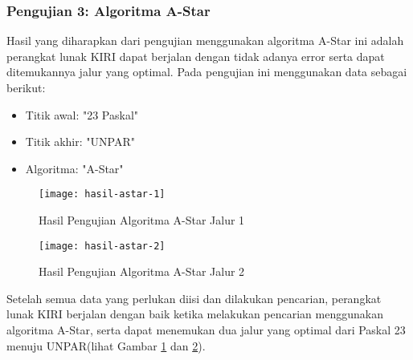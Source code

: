 \subsubsection{Pengujian 3: Algoritma A-Star}
Hasil yang diharapkan dari pengujian menggunakan algoritma A-Star ini adalah perangkat lunak KIRI dapat berjalan dengan tidak adanya error serta dapat ditemukannya jalur yang optimal. Pada pengujian ini menggunakan data sebagai berikut:
\begin{itemize}
    \item Titik awal: "23 Paskal"
    \item Titik akhir: "UNPAR"
    \item Algoritma: "A-Star"
\end{itemize}

\begin{figure}[H]
    \centering
    \texttt{[image: hasil-astar-1]}
    \caption{Hasil Pengujian Algoritma A-Star Jalur 1}
    \label{fig:hasilastar1}
\end{figure}

\begin{figure}[H]
    \centering
    \texttt{[image: hasil-astar-2]}
    \caption{Hasil Pengujian Algoritma A-Star Jalur 2}
    \label{fig:hasilastar2}
\end{figure}

Setelah semua data yang perlukan diisi dan dilakukan pencarian, perangkat lunak KIRI berjalan dengan baik ketika melakukan pencarian menggunakan algoritma A-Star, serta dapat menemukan dua jalur yang optimal dari Paskal 23 menuju UNPAR(lihat Gambar \ref{fig:hasilastar1} dan \ref{fig:hasilastar2}).

